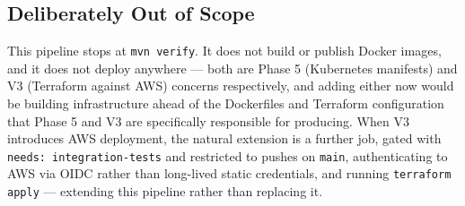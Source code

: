 \subsection{Deliberately Out of Scope}

This pipeline stops at \texttt{mvn verify}. It does not build or publish Docker images, and it does not deploy anywhere --- both are Phase 5 (Kubernetes manifests) and V3 (Terraform against AWS) concerns respectively, and adding either now would be building infrastructure ahead of the Dockerfiles and Terraform configuration that Phase 5 and V3 are specifically responsible for producing. When V3 introduces AWS deployment, the natural extension is a further job, gated with \texttt{needs: integration-tests} and restricted to pushes on \texttt{main}, authenticating to AWS via OIDC rather than long-lived static credentials, and running \texttt{terraform apply} --- extending this pipeline rather than replacing it.
